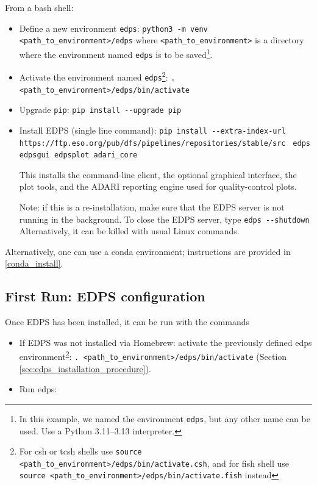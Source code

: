 From a bash shell:
\begin{itemize}

    \item Define a new environment {\tt edps}:\newline 
    \verb|python3 -m venv  <path_to_environment>/edps| \newline
    where {\tt <path\_to\_environment>} is a directory where the environment named {\tt edps} is to be saved\footnote{In this example, we named the environment {\tt edps}, but any other name can be used. Use a Python 3.11--3.13 interpreter.}. 
\medskip
   \item Activate the  environment named {\tt edps}\footnote{\label{foot:cshfish}For csh or tcsh shells use {\tt source  <path\_to\_environment>/edps/bin/activate.csh}, and for fish shell use {\tt source  <path\_to\_environment>/edps/bin/activate.fish} instead}: \newline
   \verb|. <path_to_environment>/edps/bin/activate|
\medskip

   \item Upgrade {\tt pip}:\newline
   \verb|pip install --upgrade pip|
\medskip

   \item Install EDPS (single line command): \newline
   \verb|pip install --extra-index-url | \newline
   \verb| https://ftp.eso.org/pub/dfs/pipelines/repositories/stable/src|\newline
   \verb| edps edpsgui edpsplot adari_core|

\medskip

This installs the command-line client, the optional graphical interface, the plot tools, and the ADARI reporting engine used for quality-control plots.

Note: if this is a re-installation, make sure that the EDPS server is not running in the background. To close the EDPS server, type 
\verb|edps --shutdown |
Alternatively, it can be killed with usual Linux commands.

\end{itemize}
Alternatively, one can use a conda environment; instructions are provided in \ref{conda_install}.

\subsection{First Run: EDPS configuration}
\label{sec:edps_configuration}
Once EDPS has been installed, it can be run with the commands
\begin{itemize}

\item If EDPS was not installed via Homebrew: activate the previously defined edps environment\textsuperscript{\ref{foot:cshfish}}:\newline
{\tt . <path\_to\_environment>/edps/bin/activate} (Section \ref{sec:edps_installation_procedure}).

\item   Run edps:
\end{itemize}


